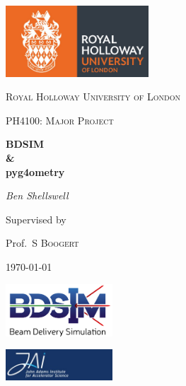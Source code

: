 \documentclass[12pt,a4paper]{article}
\begin{document}
\begin{titlepage}
	\centering
	\includegraphics[width=0.4\textwidth]{Images//Logos//rhul.jpg}\par\vspace{1cm}


	{\scshape\LARGE Royal Holloway University of London \par}
	\vspace{1cm}
	{\scshape\Large PH4100: Major Project\par}
	\vspace{1.5cm}
	{\huge\bfseries BDSIM\\
	\&\\
	pyg4ometry\par}
	\vspace{2cm}
	{\Large\itshape Ben Shellswell\par}
	\vfill

\begin{abstract}
\centering

\end{abstract}

	\vfill
	
	Supervised by\par
	Prof.~S \textsc{Boogert} 

	{\large \today\par}

\includegraphics[width=0.3\textwidth]{Images//Logos//BDSIM_Logo.jpg}\par\vspace{1cm}
\includegraphics[width=0.3\textwidth]{Images//Logos//JAI_Logo.jpeg}\par\vspace{1cm}

\end{titlepage}
\leavevmode\thispagestyle{empty}\newpage
\tableofcontents
\thispagestyle{empty}
\newpage
\onecolumn
\end{document}
